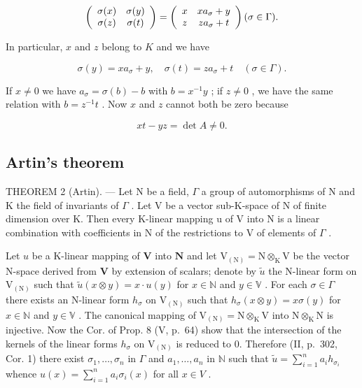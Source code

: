 \[
\left( \begin{array}{c c} \sigma (x) & \sigma (y) \\ \sigma (z) & \sigma (t) \end{array} \right) = \left( \begin{array}{c c} x & x a _ {\sigma} + y \\ z & z a _ {\sigma} + t \end{array} \right) (\sigma \in \Gamma).
\]

In particular, \(x\) and \(z\) belong to \(K\) and we have

\[
\sigma (y) = x a _ {\sigma} + y, \quad \sigma (t) = z a _ {\sigma} + t \quad (\sigma \in \Gamma).
\]

If \(x \neq 0\) we have \(a_{\sigma} = \sigma(b) - b\) with \(b = x^{-1}y\) ; if \(z \neq 0\) , we have the same relation with \(b = z^{-1}t\) . Now \(x\) and \(z\) cannot both be zero because

\[
x t - y z = \det A \neq 0.
\]

\subsection{Artin's theorem}

THEOREM 2 (Artin). --- Let N be a field, \(\Gamma\) a group of automorphisms of N and K the field of invariants of \(\Gamma\) . Let V be a vector sub-K-space of N of finite dimension over K. Then every K-linear mapping u of V into N is a linear combination with coefficients in N of the restrictions to V of elements of \(\Gamma\) .

Let \(u\) be a K-linear mapping of \(\mathbf{V}\) into \(\mathbf{N}\) and let \(\mathrm{V}_{(\mathrm{N})} = \mathrm{N} \otimes_{\mathrm{K}} \mathrm{V}\) be the vector N-space derived from \(\mathbf{V}\) by extension of scalars; denote by \(\tilde{u}\) the N-linear form on \(\mathrm{V}_{(\mathrm{N})}\) such that \(\tilde{u}(x \otimes y) = x \cdot u(y)\) for \(x \in \mathbb{N}\) and \(y \in \mathbb{V}\) . For each \(\sigma \in \Gamma\) there exists an N-linear form \(h_{\sigma}\) on \(\mathrm{V}_{(\mathrm{N})}\) such that \(h_{\sigma}(x \otimes y) = x \sigma(y)\) for \(x \in \mathbb{N}\) and \(y \in \mathbb{V}\) . The canonical mapping of \(\mathrm{V}_{(\mathrm{N})} = \mathrm{N} \otimes_{\mathrm{K}} \mathrm{V}\) into \(\mathrm{N} \otimes_{\mathrm{K}} \mathrm{N}\) is injective. Now the Cor. of Prop. 8 (V, p.~64) show that the intersection of the kernels of the linear forms \(h_{\sigma}\) on \(\mathrm{V}_{(\mathrm{N})}\) is reduced to 0. Therefore (II, p.~302, Cor. 1) there exist \(\sigma_1, \ldots, \sigma_n\) in \(\Gamma\) and \(a_1, \ldots, a_n\) in \(\mathbb{N}\) such that \(\tilde{u} = \sum_{i=1}^{n} a_i h_{\sigma_i}\) whence \(u(x) = \sum_{i=1}^{n} a_i \sigma_i(x)\) for all \(x \in V\) .

